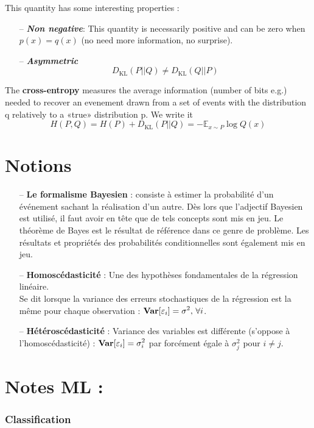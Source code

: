 \documentclass[a4paper,12pt]{report}
\newcommand{\bepar}[1]{
	\left( #1 \right)  
}
\newcommand\bk{\color{black}}
\newcommand\brick{\color{brick}}
\newcommand\navy{\color{navy}}
\numberwithin{equation}{section} %
\begin{document}
\noindent This quantity has some interesting properties :
\begin{itemize}
 \item[--] \textit{\textbf{Non negative}}: This quantity is necessarily positive and can be zero when $p(x) = q(x)$ (no need more information, no surprise). \\[1mm]
 \item[--] \textbf{\textit{Asymmetric}}$$ D_{\text{KL}}\bepar{P||Q} \neq D_{\text{KL}}\bepar{Q||P} $$
\end{itemize}

\noindent The \textbf{cross-entropy} measures the average information (number of bits e.g.) needed to recover an evenement drawn from a set of events with the distribution q relatively to a «true» distribution p. We write it $$ H(P,Q) = H(P) + D_{\text{KL}}\bepar{P||Q} = -\mathbb{E}_{x\sim P} \log Q(x)$$  

\newpage 

\navy \chapter{Notions} \bk
\begin{itemize}
\item[--] \textbf{Le formalisme Bayesien} : consiste à estimer la probabilité d'un événement sachant la réalisation d'un autre. Dès lors que l'adjectif Bayesien est utilisé, il faut avoir en tête que de tels concepts sont mis en jeu. Le théorème de Bayes est le résultat de référence dans ce genre de problème. Les résultats et propriétés des probabilités conditionnelles sont également mis en jeu.
\item[--] \textbf{Homoscédasticité} : Une des hypothèses fondamentales de la régression linéaire. \\
Se dit lorsque la variance des erreurs stochastiques de la régression est la même pour chaque observation : $\displaystyle \text{\textbf{Var}}[\varepsilon_i] = \sigma^2, \, \forall i$.
\item[--] \textbf{Hétéroscédasticité} : Variance des variables est différente (s'oppose à l'homoscédasticité) : $\displaystyle \text{\textbf{Var}}[\varepsilon_i] = \sigma_i^2$ par forcément égale à $\sigma_j^2$ pour $i \neq j$.
\end{itemize}

\newpage 

\navy \chapter{Notes ML : \cite{muller2016introduction}} \bk
\brick \subsection{Classification}\bk
\end{document}
